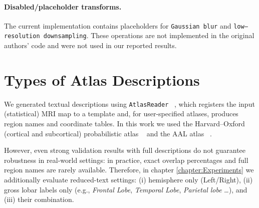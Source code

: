 \documentclass[FCD_GNN.tex]{subfiles}
\begin{document}
\paragraph{Disabled/placeholder transforms.}
The current implementation contains placeholders for \texttt{Gaussian blur} and \texttt{low–resolution downsampling}.
These operations are not implemented in the original authors’ code and were not used in our reported results.

\section{Types of Atlas Descriptions}

We generated textual descriptions using \texttt{AtlasReader} ~\cite{notter2019atlasreader}, which registers the 
input (statistical) MRI map to a template and, for user-specified atlases, produces region names and coordinate tables. 
In this work we used the Harvard--Oxford (cortical and subcortical) probabilistic atlas ~\cite{harvardoxford_rrid} and the AAL atlas ~\cite{tzourio2002aal}. 

However, even strong validation results with full descriptions do not guarantee robustness in real-world settings: 
in practice, exact overlap percentages and full region names are rarely available. Therefore, in 
chapter \ref{chapter:Experiments} we additionally evaluate reduced-text settings: (i) hemisphere only (Left/Right), 
(ii) gross lobar labels only (e.g., \emph{Frontal Lobe}, \emph{Temporal Lobe}, \emph{Parietal lobe} \dots), and (iii) their combination.
\end{document}
